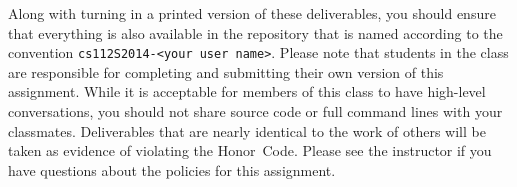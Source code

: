   Along with turning in a printed version of these deliverables, you should ensure that everything is also available in
  the repository that is named according to the convention {\tt cs112S2014-<your user name>}. Please note that students
  in the class are responsible for completing and submitting their own version of this assignment.    While it is
  acceptable for members of this class to have high-level conversations, you should not share source code or full
  command lines with your classmates.  Deliverables that are nearly identical to the work of others will be taken as
  evidence of violating the \mbox{Honor Code}.  Please see the instructor if you have questions about the policies for
  this assignment.

  
